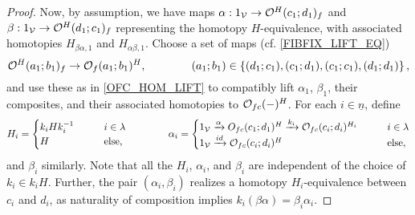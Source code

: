 \documentclass[a4paper,10pt
,draft
]{article}%
\renewcommand{\1}{\eta}%
\begin{document}
\begin{proof}
      Now, by assumption, we have maps
      $\alpha: 1_{\mathcal V} \to \mathcal{O}^H(c_1;d_1)_f$ and $\beta: 1_{\mathcal V} \to \mathcal{O}^H(d_1;c_1)_f$
      representing the homotopy $H$-equivalence,
      with associated homotopies $H_{\beta\alpha,1}$ and $H_{\alpha\beta,1}$.
      Choose a set of maps (cf. \eqref{FIBFIX_LIFT_EQ})
      \begin{equation}
            \mathcal{O}^H(a_1;b_1)_f \to \mathcal{O}_f(a_1;b_1)^H,
            \qquad \qquad
            (a_1;b_1) \in  \left\{(d_1;c_1), (c_1;d_1), (c_1;c_1), (d_1;d_1)\right\},
      \end{equation}
      and use these as in \eqref{OFC_HOM_LIFT} to compatibly lift
      $\alpha_1$, $\beta_1$, their composites, and their associated homotopies to $\mathcal{O}_{f c}(-)^H$.
      For each $i \in \underline{n}$, define
      \begin{equation}
            \label{WEAKEQCOLORS_EQ}
            H_i =
            \begin{cases}
                  k_i H k_i^{-1} \qquad & i \in \lambda
                  \\
                  H & \mbox{else,}
            \end{cases}
            \qquad
            \qquad 
            \alpha_i =
            \begin{cases}
                  1_{\mathcal V} \xrightarrow{\alpha} O_{f c}(c_1;d_1)^H \xrightarrow{k_i} \mathcal{O}_{f c}(c_i;d_i)^{H_i} \qquad & i \in \lambda
                  \\
                  1_{\mathcal V} \xrightarrow{id} \mathcal{O}_{f c}(c_i;d_i)^H & \mbox{else},
            \end{cases}
      \end{equation}
      and $\beta_i$ similarly.
      Note that all the $H_i$, $\alpha_i$, and $\beta_i$ are independent of the choice of $k_i \in k_i H$.
      Further, 
      the pair $(\alpha_i,\beta_i)$ realizes a homotopy $H_i$-equivalence between $c_i$ and $d_i$,
      as naturality of composition implies
      $k_i (\beta\alpha) = \beta_i\alpha_i$.
      

\end{proof}
\end{document}
